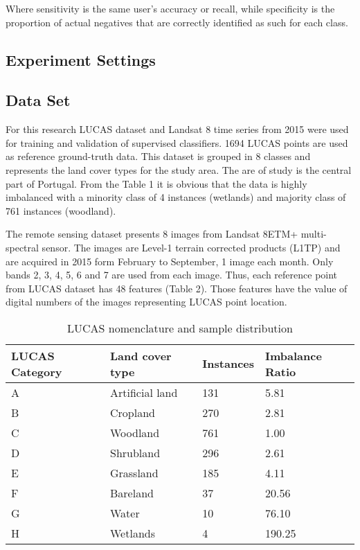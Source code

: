 \documentclass[parskip=full]{scrartcl}
\begin{document}
Where sensitivity is the same user's accuracy or recall, while specificity is 
the proportion of actual negatives that are correctly identified as such for 
each class. 

\subsection{Experiment Settings}

\subsection{Data Set}

For this research LUCAS dataset and Landsat 8 time series from 2015 were used 
for training and validation of supervised classifiers. 1694 LUCAS points are 
used as reference ground-truth data. This dataset is grouped in 8 classes and 
represents the land cover types for the study area. The are  of study is the 
central part of Portugal. From the Table 1 it is obvious that the data is 
highly imbalanced with a minority class of 4 instances (wetlands) and majority 
class of 761 instances (woodland). 

The remote sensing dataset presents 8 images from Landsat 8ETM+ multi-spectral 
sensor. The images are Level-1 terrain corrected products (L1TP) and are 
acquired in 2015 form February to September, 1 image each month. Only bands 2, 
3, 4, 5, 6 and 7 are used from each image. Thus, each reference point from 
LUCAS dataset has 48 features (Table 2). Those features have the value of 
digital numbers of the images representing LUCAS point location. 

\begin{table}[H]
	\centering
	\begin{tabular}{|p{2.2cm}|p{2.3cm}|p{2cm}|p{2cm}|}
		\hline
		\textbf{LUCAS Category} & \textbf{Land cover type} & \textbf{Instances} 
		& \textbf{Imbalance Ratio} \\
		\hline
		A & Artificial land& 131 & 5.81 \\
		\hline
		B & Cropland & 270 & 2.81 \\
		\hline
		C & Woodland & 761 & 1.00 \\
		\hline
		D & Shrubland & 296 & 2.61 \\
		\hline
		E & Grassland & 185 & 4.11 \\
		\hline
		F & Bareland & 37 & 20.56 \\
		\hline
		G & Water & 10 & 76.10 \\
		\hline
		H & Wetlands & 4 &  190.25\\
		\hline
	\end{tabular}
	\caption{\label{tab:datasets}LUCAS nomenclature and sample distribution}
\end{table}
\end{document}
